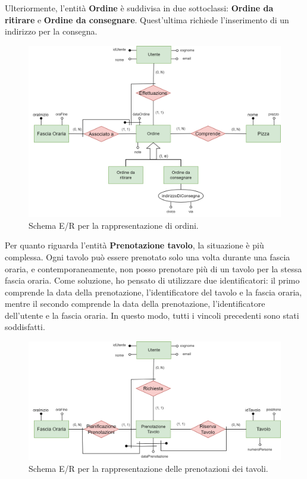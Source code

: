 \documentclass[a4paper,12pt, oneside]{article}
\begin{document}
Ulteriormente, l'entità \textbf{Ordine} è suddivisa in due
sottoclassi: \textbf{Ordine da ritirare} e
\textbf{Ordine da consegnare}. Quest'ultima richiede
l'inserimento di un indirizzo per la consegna.

\begin{figure}[ht]
    \centering
    \includegraphics[width=1\textwidth]{images/diagramma_ordine.png}
    \caption{Schema E/R per la rappresentazione di ordini.}
    \label{fig:diagramma_ordine}
\end{figure}

Per quanto riguarda l'entità \textbf{Prenotazione tavolo}, la
situazione è più complessa. Ogni tavolo può essere prenotato solo una
volta durante una fascia oraria, e contemporaneamente, non posso
prenotare più di un tavolo per la stessa fascia oraria. Come soluzione,
ho pensato di utilizzare due identificatori: il primo comprende la data
della prenotazione, l'identificatore del tavolo e la fascia oraria,
mentre il secondo comprende la data della prenotazione,
l'identificatore dell'utente e la fascia oraria. In questo modo, tutti
i vincoli precedenti sono stati soddisfatti.

\begin{figure}[ht]
    \centering
    \includegraphics[width=1\textwidth]{images/diagramma_tavolo.png}
    \caption{Schema E/R per la rappresentazione delle prenotazioni dei tavoli.}
    \label{fig:diagramma_tavolo}
\end{figure}
\end{document}
